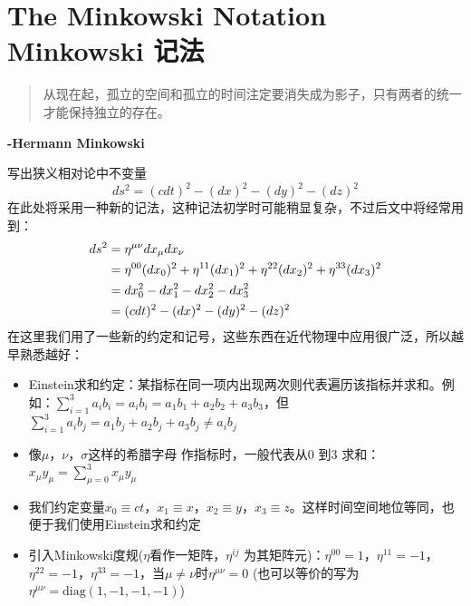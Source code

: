 \section[Minkowski记法]{The Minkowski Notation \quad Minkowski 记法}
\label{sec2.4}
\begin{quote}
从现在起，孤立的空间和孤立的时间注定要消失成为影子，只有两者的统一才能保持独立的存在。
\end{quote}
\begin{flushright}
  {\bf{-Hermann Minkowski}}
\end{flushright}
写出狭义相对论中不变量
\begin{equation}\label{equ2.23}
 ds^2=(cdt)^2-(dx)^2-(dy)^2-(dz)^2
\end{equation}
在此处将采用一种新的记法，这种记法初学时可能稍显复杂，不过后文中将经常用到：\\
\begin{align}
ds^2&=\eta^{\mu\nu}dx_\mu dx_\nu \notag \\
&=\eta^{00}(dx_0)^2+\eta^{11}(dx_1)^2+\eta^{22}(dx_2)^2+\eta^{33}(dx_3)^2 \notag \\
&=dx_0^2-dx_1^2-dx_2^2-dx_3^2\notag \\
&=(cdt)^2-(dx)^2-(dy)^2-(dz)^2 \label{equ2.24}
\end{align}
在这里我们用了一些新的约定和记号，这些东西在近代物理中应用很广泛，所以越早熟悉越好：
\begin{itemize}
  \item Einstein求和约定：某指标在同一项内出现两次则代表遍历该指标并求和。例如：$\sum_{i=1}^3a_i b_i =a_i b_i=a_1 b_1 +a_2 b_2 +a_3 b_3$，但$\sum_{i=1}^3a_i b_j=a_1 b_j +a_2 b_j +a_3 b_j\neq a_i b_j$
  \item 像$\mu$，$\nu$，$\sigma$这样的希腊字母
   作指标时，一般代表从0 到3 求和：$x_\mu y_\mu=\sum_{\mu=0}^3 x_\mu y_\mu $
  \item 我们约定变量$x_0\equiv ct$，$x_1\equiv x$，$x_2\equiv y$，$x_3\equiv z$。这样时间空间地位等同，也便于我们使用Einstein求和约定
  \item 引入Minkowski度规($\eta$看作一矩阵，$\eta^{ij}$ 为其矩阵元)：$\eta^{00}=1$，$\eta^{11}=-1$，$\eta^{22}=-1$，$\eta^{33}=-1$，当$\mu \neq \nu$时$\eta^{\mu\nu}=0$  (也可以等价的写为
      $\eta^{\mu\nu} = \mathrm{diag} (1,-1,-1,-1)$)
\end{itemize}

